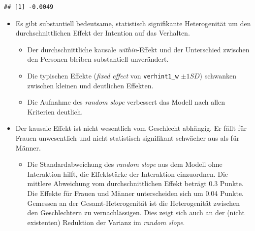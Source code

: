 \documentclass[
]{book}
\newenvironment{Shaded}{\begin{snugshade}}{\end{snugshade}}
\newcommand{\CommentTok}[1]{\textcolor[rgb]{0.56,0.35,0.01}{\textit{#1}}}
\newcommand{\DecValTok}[1]{\textcolor[rgb]{0.00,0.00,0.81}{#1}}
\newcommand{\KeywordTok}[1]{\textcolor[rgb]{0.13,0.29,0.53}{\textbf{#1}}}
\newcommand{\NormalTok}[1]{#1}
\newcommand{\OperatorTok}[1]{\textcolor[rgb]{0.81,0.36,0.00}{\textbf{#1}}}
\newcommand{\StringTok}[1]{\textcolor[rgb]{0.31,0.60,0.02}{#1}}
\providecommand{\tightlist}{%
  \setlength{\itemsep}{0pt}\setlength{\parskip}{0pt}}
\begin{document}
\begin{Shaded}
\end{Shaded}

\begin{verbatim}
## [1] -0.0049
\end{verbatim}

\begin{itemize}
\tightlist
\item
  Es gibt substantiell bedeutsame, statistisch signifikante Heterogenität um den durchschnittlichen Effekt der Intention auf das Verhalten.

  \begin{itemize}
  \tightlist
  \item
    Der durchschnittliche kausale \emph{within}-Effekt und der Unterschied zwischen den Personen bleiben substantiell unverändert.
  \item
    Die typischen Effekte (\emph{fixed effect} von \texttt{verhint1\_w} \(\pm 1 SD\)) schwanken zwischen kleinen und deutlichen Effekten.
  \item
    Die Aufnahme des \emph{random slope} verbessert das Modell nach allen Kriterien deutlich.
  \end{itemize}
\item
  Der kausale Effekt ist nicht wesentlich vom Geschlecht abhängig. Er fällt für Frauen unwesentlich und nicht statistisch signifikant schwächer aus als für Männer.

  \begin{itemize}
  \tightlist
  \item
    Die Standardabweichung des \emph{random slope} aus dem Modell ohne Interaktion hilft, die Effektstärke der Interaktion einzuordnen. Die mittlere Abweichung vom durchschnittlichen Effekt beträgt 0.3 Punkte. Die Effekte für Frauen und Männer unterscheiden sich um 0.04 Punkte. Gemessen an der Gesamt-Heterogenität ist die Heterogenität zwischen den Geschlechtern zu vernachlässigen. Dies zeigt sich auch an der (nicht existenten) Reduktion der Varianz im \emph{random slope}.
  \end{itemize}
\end{itemize}
\end{document}
